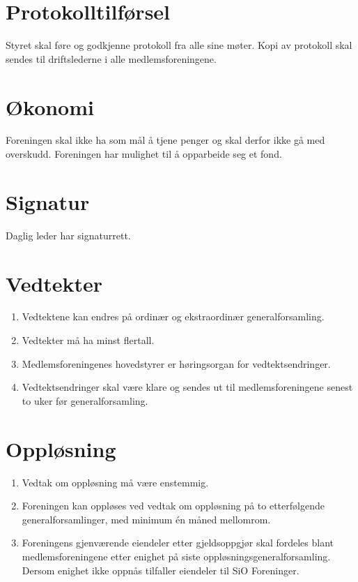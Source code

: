 \documentclass[11pt,norsk,a4paper]{article}
\begin{document}
\section{Protokolltilførsel}
Styret skal føre og godkjenne protokoll fra alle sine møter.
Kopi av protokoll skal sendes til driftslederne i alle medlemsforeningene.


\section{Økonomi}
Foreningen skal ikke ha som mål å tjene penger og skal derfor ikke gå med overskudd.
Foreningen har mulighet til å opparbeide seg et fond.


\section{Signatur}
Daglig leder har signaturrett.


\section{Vedtekter\label{sec:vedtekter}}
\begin{enumerate}
	\item Vedtektene kan endres på ordinær og ekstraordinær generalforsamling.
	\item Vedtekter må ha minst  flertall.
	\item Medlemsforeningenes hovedstyrer er høringsorgan for vedtektsendringer.
	\item Vedtektsendringer skal være klare og sendes ut til medlemsforeningene senest to uker før generalforsamling.
\end{enumerate}


\section{Oppløsning\label{sec:opplosing}}
\begin{enumerate}
	\item Vedtak om oppløsning må være enstemmig.
	\item Foreningen kan oppløses ved vedtak om oppløsning på to etterfølgende generalforsamlinger, med minimum én måned mellomrom.
	\item Foreningens gjenværende eiendeler etter gjeldsoppgjør skal fordeles blant medlemsforeningene etter enighet på siste oppløsningsgeneralforsamling. Dersom enighet ikke oppnås tilfaller eiendeler til SiO Foreninger.
\end{enumerate}
\end{document}
